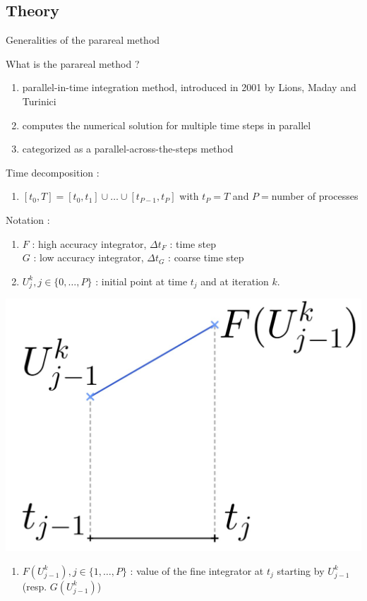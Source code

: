 \subsection{Theory}

\begin{frame}[allowframebreaks]{Generalities of the parareal method}
	
	\small
	What is the parareal method ?
	\begin{enumerate}[\textbullet]
		\item parallel-in-time integration method, introduced in 2001 by Lions, Maday and Turinici
		\item computes the numerical solution for multiple time steps in parallel
		\item categorized as a parallel-across-the-steps method 
	\end{enumerate}

	\newpage

	Time decomposition :
	\begin{enumerate}[\textbullet]
		\item $[t_0,T]=[t_0,t_1]\cup\dots\cup[t_{P-1},t_P]$ with $t_P=T$ and $P=$number of processes
	\end{enumerate}

	\begin{minipage}{.68\linewidth}
		Notation :
		\begin{enumerate}[\textbullet]
			\item $F$ : high accuracy integrator, \quad $\Delta t_F$ : time step \\
			$G$ : low accuracy integrator, \quad $\Delta t_G$ : coarse time step
			\item $U_j^k, j\in\{0,\dots,P\}$ : initial point at time $t_j$ and at iteration $k$.
		\end{enumerate}
	\end{minipage}
	\begin{minipage}{.28\linewidth}
		\qquad \includegraphics[width=0.7\linewidth]{images/parareal/explane_F.jpg}
	\end{minipage}
	\begin{enumerate}[\textbullet]
		\item $F(U_{j-1}^k), j\in\{1,\dots,P\}$ : value of the fine integrator at $t_j$ starting by $U_{j-1}^k$ (resp. $G(U_{j-1}^k)$)
	\end{enumerate}
	
\end{frame}

